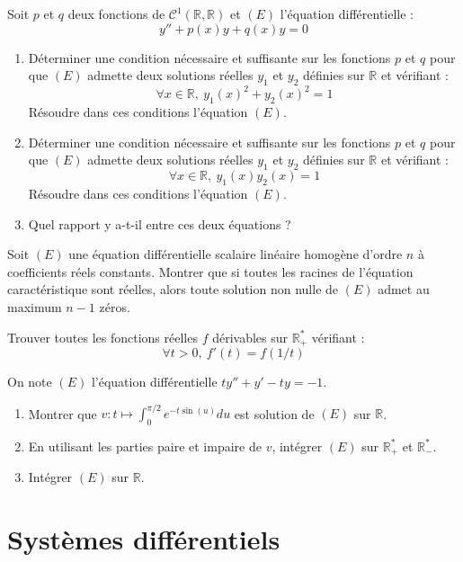 \documentclass[french,a4paper]{article}
\newcommand{\R}{\mathbb{R}}
\newcommand{\st}{^*}
\theoremstyle{plain}
\theoremstyle{definition}
\theoremstyle{remark}
\begin{document}
\begin{ex}[Moulin.ED.17]{}
	Soit $p$ et $q$ deux fonctions de $\mathcal{C}^1(\R,\R)$ et $(E)$ l'équation différentielle : $$y''+p(x)y+q(x)y=0$$
	\begin{enumerate}
		\item Déterminer une condition nécessaire et suffisante sur les fonctions $p$ et $q$ pour que $(E)$ admette deux solutions réelles $y_1$ et $y_2$ définies sur $\R$ et vérifiant : $$\forall x\in\R,\ y_1(x)^2+y_2(x)^2=1$$
		Résoudre dans ces conditions l'équation $(E)$.
		\item Déterminer une condition nécessaire et suffisante sur les fonctions $p$ et $q$ pour que $(E)$ admette deux solutions réelles $y_1$ et $y_2$ définies sur $\R$ et vérifiant : $$\forall x\in\R,\ y_1(x)y_2(x)=1$$
		Résoudre dans ces conditions l'équation $(E)$.
		\item Quel rapport y a-t-il entre ces deux équations ?
	\end{enumerate}
\end{ex}

\begin{ex}[Moulin.ED.18]{}
	Soit $(E)$ une équation différentielle scalaire linéaire homogène d'ordre $n$ à coefficients réels constants. Montrer que si toutes les racines de l'équation caractéristique sont réelles, alors toute solution non nulle de $(E)$ admet au maximum $n-1$ zéros.
\end{ex}

\begin{ex}[Moulin.ED.19]{}
	Trouver toutes les fonctions réelles $f$ dérivables sur $\R_+\st$ vérifiant : $$\forall t>0,\ f'(t)=f(1/t)$$
\end{ex}

\begin{ex}[Moulin.ED.20]{}
	On note $(E)$ l'équation différentielle $ty''+y'-ty=-1$.
	\begin{enumerate}
		\item Montrer que $v:t\mapsto\displaystyle\int_{0}^{\pi/2}e^{-t\sin(u)}du$ est solution de $(E)$ sur $\R$.
		\item En utilisant les parties paire et impaire de $v$, intégrer $(E)$ sur $\R_+\st$ et $\R_-\st$.
		\item Intégrer $(E)$ sur $\R$.
	\end{enumerate}
\end{ex}

\section{Systèmes différentiels}
\end{document}

